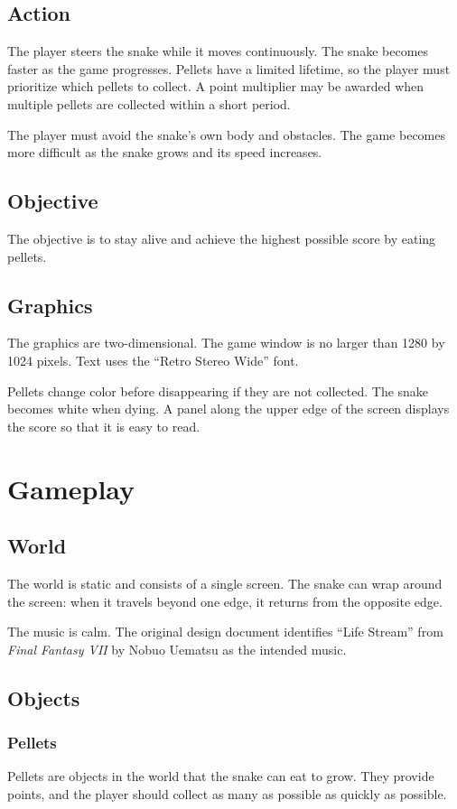\subsection{Action}
The player steers the snake while it moves continuously. The snake becomes faster as the game progresses. Pellets have a limited lifetime, so the player must prioritize which pellets to collect. A point multiplier may be awarded when multiple pellets are collected within a short period.

The player must avoid the snake's own body and obstacles. The game becomes more difficult as the snake grows and its speed increases.

\subsection{Objective}
The objective is to stay alive and achieve the highest possible score by eating pellets.

\subsection{Graphics}
The graphics are two-dimensional. The game window is no larger than 1280 by 1024 pixels. Text uses the ``Retro Stereo Wide'' font.

Pellets change color before disappearing if they are not collected. The snake becomes white when dying. A panel along the upper edge of the screen displays the score so that it is easy to read.

\section{Gameplay}

\subsection{World}
The world is static and consists of a single screen. The snake can wrap around the screen: when it travels beyond one edge, it returns from the opposite edge.

The music is calm. The original design document identifies ``Life Stream'' from \emph{Final Fantasy VII} by Nobuo Uematsu as the intended music.

\subsection{Objects}

\subsubsection{Pellets}
Pellets are objects in the world that the snake can eat to grow. They provide points, and the player should collect as many as possible as quickly as possible.

